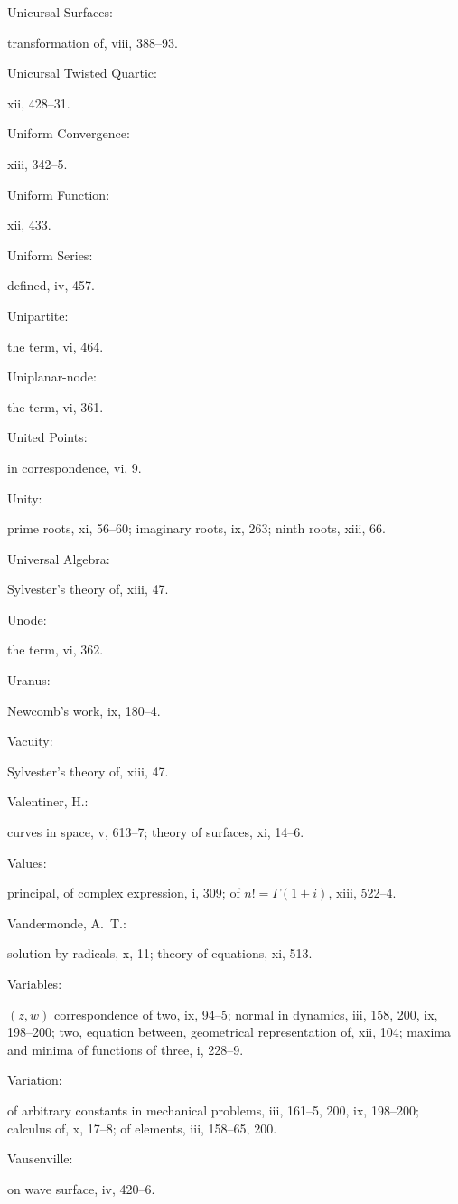 \documentclass[11pt,a4paper]{book}
\providecommand{\V}[1]{#1}
\providecommand{\IndexEntry}[2]{#1\dotfill #2\par}
\begin{document}
\IndexEntry{Unicursal Surfaces}: transformation of, \V{viii}, 388--93.

\IndexEntry{Unicursal Twisted Quartic}: \V{xii}, 428--31.

\IndexEntry{Uniform Convergence}: \V{xiii}, 342--5.

\IndexEntry{Uniform Function}: \V{xii}, 433.

\IndexEntry{Uniform Series}: defined, \V{iv}, 457.

\IndexEntry{Unipartite}: the term, \V{vi}, 464.

\IndexEntry{Uniplanar-node}: the term, \V{vi}, 361.

\IndexEntry{United Points}: in correspondence, \V{vi}, 9.

\IndexEntry{Unity}: prime roots, \V{xi}, 56--60; imaginary roots, \V{ix}, 263; ninth roots, \V{xiii}, 66.

\IndexEntry{Universal Algebra}: Sylvester's theory of, \V{xiii}, 47.

\IndexEntry{Unode}: the term, \V{vi}, 362.

\IndexEntry{Uranus}: Newcomb's work, \V{ix}, 180--4.

\IndexEntry{Vacuity}: Sylvester's theory of, \V{xiii}, 47.

\IndexEntry{Valentiner, H.}: curves in space, \V{v}, 613--7; theory of surfaces, \V{xi}, 14--6.

\IndexEntry{Values}: principal, of complex expression, \V{i}, 309; of $n! = \Gamma(1+i)$, \V{xiii}, 522--4.

\IndexEntry{Vandermonde, A.\ T.}: solution by radicals, \V{x}, 11; theory of equations, \V{xi}, 513.

\IndexEntry{Variables}: $(z, w)$ correspondence of two, \V{ix}, 94--5; normal in dynamics, \V{iii}, 158, 200, \V{ix}, 198--200; two, equation between, geometrical representation of, \V{xii}, 104; maxima and minima of functions of three, \V{i}, 228--9.

\newpage

\setcounter{page}{131}

\IndexEntry{Variation}: of arbitrary constants in mechanical problems, \V{iii}, 161--5, 200, \V{ix}, 198--200; calculus of, \V{x}, 17--8; of elements, \V{iii}, 158--65, 200.

\IndexEntry{Vausenville}: on wave surface, \V{iv}, 420--6.
\end{document}
